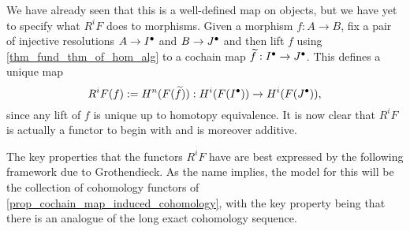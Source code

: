 We have already seen that this is a well-defined map on objects, but
we have yet to specify what $R^iF$ does to morphisms.
Given a morphism $f: A \to B$, fix a pair of injective resolutions $A
\to {{I}}^{\bullet}$ and $B \to {{J}}^{\bullet}$ and then lift $f$
using \cref{thm_fund_thm_of_hom_alg} to a cochain map $\widetilde{f}:
{{I}}^{\bullet} \to {{J}}^{\bullet}$.
This defines a unique map
\[
  R^iF(f) := H^n(F(\widetilde{f})): H^i(F({{I}}^{\bullet})) \to
  H^i(F({{J}}^{\bullet})),
\]
since any lift of $f$ is unique up to homotopy equivalence.
It is now clear that $R^iF$ is actually a functor to begin with and
is moreover additive.

The key properties that the functors $R^iF$ have are best expressed
by the following framework due to Grothendieck.
As the name implies, the model for this will be the collection of
cohomology functors of \cref{prop_cochain_map_induced_cohomology},
with the key property being that there is an analogue of the long
exact cohomology sequence.

